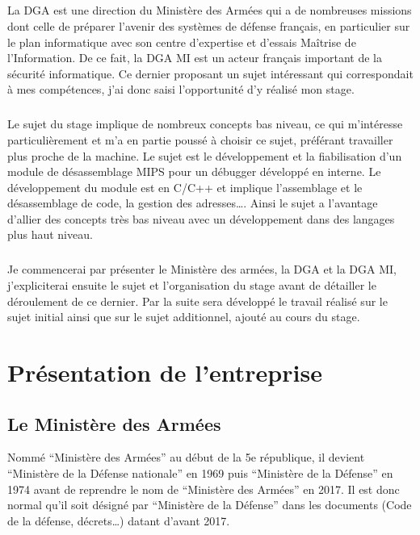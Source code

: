 \documentclass[11pt, book, english, french, standardlists]{upmethodology-document}
\begin{document}
		\paragraph*{}
			La \gls{DGA} est une direction du Ministère des Armées qui a de nombreuses missions dont celle de préparer l'avenir des systèmes de défense français, en particulier sur le plan informatique avec son centre d'expertise et d'essais Maîtrise de l'Information. De ce fait, la \gls{DGA MI} est un acteur français important de la sécurité informatique. Ce dernier proposant un sujet intéressant qui correspondait à mes compétences, j'ai donc saisi l'opportunité d'y réalisé mon stage.
		\paragraph*{}
			Le sujet du stage implique de nombreux concepts bas niveau, ce qui m'intéresse particulièrement et m'a en partie poussé à choisir ce sujet, préférant travailler plus proche de la machine.  Le sujet est le développement et la fiabilisation d'un module de désassemblage \acrshort{MIPS} pour un débugger développé en interne. Le développement du module est en C/C++ et implique l'assemblage et le désassemblage de code, la gestion des adresses\ldots. Ainsi le sujet a l'avantage d'allier des concepts très bas niveau avec un développement dans des langages plus haut niveau.
		\paragraph*{}
			Je commencerai par présenter le Ministère des armées, la \gls{DGA} et la \gls{DGA MI}, j'expliciterai ensuite le sujet et l'organisation du stage avant de détailler le déroulement de ce dernier. Par la suite sera développé le travail réalisé sur le sujet initial ainsi que sur le sujet additionnel, ajouté au cours du stage.
	\chapter{Présentation de l'entreprise}
		\section{Le Ministère des Armées}
			\begin{upminfo}
				Nommé ``Ministère des Armées'' au début de la 5e république, il devient ``Ministère de la Défense nationale'' en 1969 puis ``Ministère de la Défense'' en 1974 avant de reprendre le nom de ``Ministère des Armées'' en 2017. Il est donc normal qu'il soit désigné par ``Ministère de la Défense'' dans les documents (Code de la défense, décrets\ldots) datant d'avant 2017.
			\end{upminfo}
\end{document}
